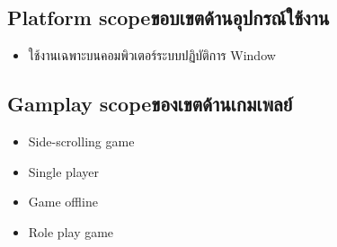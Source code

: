 \subsection{\ifenglish Platform scope\else ขอบเขตด้านอุปกรณ์ใช้งาน\fi}
\begin{itemize}
    \item ใช้งานเฉพาะบนคอมพิวเตอร์ระบบปฏิบัติการ Window
\end{itemize}

\subsection{\ifenglish Gamplay scope\else ของเขตด้านเกมเพลย์\fi}
\begin{itemize}
    \item Side-scrolling game
    \item Single player
    \item Game offline
    \item Role play game
\end{itemize}




